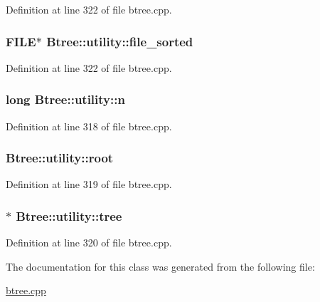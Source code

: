 Definition at line 322 of file btree.\-cpp.

\hypertarget{class_btree_1_1utility_a80674e7b3d4c2213a869bf777c5b5786}{
\subsubsection[{file\-\_\-sorted}]{\setlength{\rightskip}{0pt plus 5cm}F\-I\-L\-E$\ast$ Btree\-::utility\-::file\-\_\-sorted}}\label{class_btree_1_1utility_a80674e7b3d4c2213a869bf777c5b5786}


Definition at line 322 of file btree.\-cpp.

\hypertarget{class_btree_1_1utility_ae9064062347c4ddf60c21243d3d6ac19}{
\subsubsection[{n}]{\setlength{\rightskip}{0pt plus 5cm}long Btree\-::utility\-::n}}\label{class_btree_1_1utility_ae9064062347c4ddf60c21243d3d6ac19}


Definition at line 318 of file btree.\-cpp.

\hypertarget{class_btree_1_1utility_a240cdc9a802b5d396fb15ebf2bf1e3de}{
\subsubsection[{root}]{ Btree\-::utility\-::root}}\label{class_btree_1_1utility_a240cdc9a802b5d396fb15ebf2bf1e3de}


Definition at line 319 of file btree.\-cpp.

\hypertarget{class_btree_1_1utility_a3d8a863144f66d882e5c848b449a8130}{
\subsubsection[{tree}]{$\ast$ Btree\-::utility\-::tree}}\label{class_btree_1_1utility_a3d8a863144f66d882e5c848b449a8130}


Definition at line 320 of file btree.\-cpp.



The documentation for this class was generated from the following file\-:\begin{DoxyCompactItemize}
\item 
\hyperlink{btree_8cpp}{btree.\-cpp}\end{DoxyCompactItemize}

